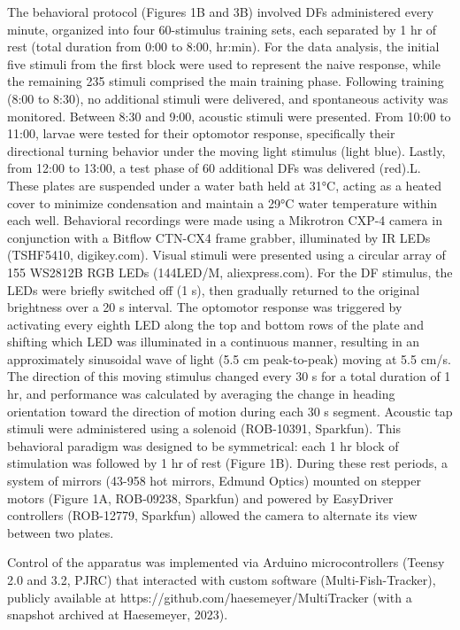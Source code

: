\documentclass[9pt,lineno]{RandlettLab_elife}
\begin{document}
The behavioral protocol (Figures 1B and 3B) involved DFs administered every minute, organized into four 60-stimulus training sets, each separated by 1 hr of rest (total duration from 0:00 to 8:00, hr:min). For the data analysis, the initial five stimuli from the first block were used to represent the naive response, while the remaining 235 stimuli comprised the main training phase. Following training (8:00 to 8:30), no additional stimuli were delivered, and spontaneous activity was monitored. Between 8:30 and 9:00, acoustic stimuli were presented. From 10:00 to 11:00, larvae were tested for their optomotor response, specifically their directional turning behavior under the moving light stimulus (light blue). Lastly, from 12:00 to 13:00, a test phase of 60 additional DFs was delivered (red).L. These plates are suspended under a water bath held at 31°C, acting as a heated cover to minimize condensation and maintain a 29°C water temperature within each well. Behavioral recordings were made using a Mikrotron CXP-4 camera in conjunction with a Bitflow CTN-CX4 frame grabber, illuminated by IR LEDs (TSHF5410, digikey.com). Visual stimuli were presented using a circular array of 155 WS2812B RGB LEDs (144LED/M, aliexpress.com). For the DF stimulus, the LEDs were briefly switched off (1 s), then gradually returned to the original brightness over a 20 s interval. The optomotor response was triggered by activating every eighth LED along the top and bottom rows of the plate and shifting which LED was illuminated in a continuous manner, resulting in an approximately sinusoidal wave of light (5.5 cm peak-to-peak) moving at 5.5 cm/s. The direction of this moving stimulus changed every 30 s for a total duration of 1 hr, and performance was calculated by averaging the change in heading orientation toward the direction of motion during each 30 s segment. Acoustic tap stimuli were administered using a solenoid (ROB-10391, Sparkfun). This behavioral paradigm was designed to be symmetrical: each 1 hr block of stimulation was followed by 1 hr of rest (Figure 1B). During these rest periods, a system of mirrors (43-958 hot mirrors, Edmund Optics) mounted on stepper motors (Figure 1A, ROB-09238, Sparkfun) and powered by EasyDriver controllers (ROB-12779, Sparkfun) allowed the camera to alternate its view between two plates.

Control of the apparatus was implemented via Arduino microcontrollers (Teensy 2.0 and 3.2, PJRC) that interacted with custom software (Multi-Fish-Tracker), publicly available at https://github.com/haesemeyer/MultiTracker (with a snapshot archived at Haesemeyer, 2023).
\end{document}
